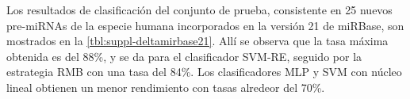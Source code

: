 Los resultados de clasificación del conjunto de prueba, consistente en
25 nuevos pre-miRNAs de la especie humana incorporados en la versión
21 de miRBase, son mostrados en la \autoref{tbl:suppl-deltamirbase21}.
Allí se observa que la tasa máxima obtenida es del 88\%, y se da para
el clasificador SVM-RE, seguido por la estrategia RMB con una tasa del
84\%. Los clasificadores MLP y SVM con núcleo lineal obtienen un menor
rendimiento con tasas alredeor del 70\%.